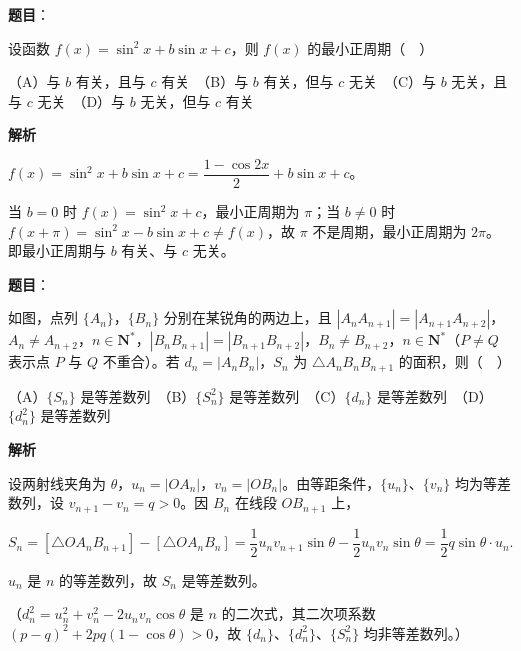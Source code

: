 \begin{answer}

\textbf{题目}：

设函数 \(f(x)=\sin^{2}x+b\sin x+c\)，则 \(f(x)\) 的最小正周期（　）

（A）与 \(b\) 有关，且与 \(c\) 有关　（B）与 \(b\) 有关，但与 \(c\) 无关　（C）与 \(b\) 无关，且与 \(c\) 无关　（D）与 \(b\) 无关，但与 \(c\) 有关

\textbf{解析}

\(f(x)=\sin^{2}x+b\sin x+c=\dfrac{1-\cos 2x}{2}+b\sin x+c\)。

当 \(b=0\) 时 \(f(x)=\sin^{2}x+c\)，最小正周期为 \(\pi\)；当 \(b\neq 0\) 时 \(f(x+\pi)=\sin^{2}x-b\sin x+c\neq f(x)\)，故 \(\pi\) 不是周期，最小正周期为 \(2\pi\)。即最小正周期与 \(b\) 有关、与 \(c\) 无关。


\end{answer}
\begin{answer}

\textbf{题目}：

如图，点列 \(\{A_{n}\}\)，\(\{B_{n}\}\) 分别在某锐角的两边上，且 \(|A_{n}A_{n+1}|=|A_{n+1}A_{n+2}|\)，\(A_{n}\neq A_{n+2}\)，\(n\in\mathbf{N}^{*}\)，\(|B_{n}B_{n+1}|=|B_{n+1}B_{n+2}|\)，\(B_{n}\neq B_{n+2}\)，\(n\in\mathbf{N}^{*}\)（\(P\neq Q\) 表示点 \(P\) 与 \(Q\) 不重合）。若 \(d_{n}=|A_{n}B_{n}|\)，\(S_{n}\) 为 \(\triangle A_{n}B_{n}B_{n+1}\) 的面积，则（　）
\nopagebreak[4]
\begin{center}\end{center}
\nopagebreak[4]
（A）\(\{S_{n}\}\) 是等差数列　（B）\(\{S_{n}^{2}\}\) 是等差数列　（C）\(\{d_{n}\}\) 是等差数列　（D）\(\{d_{n}^{2}\}\) 是等差数列

\textbf{解析}

设两射线夹角为 \(\theta\)，\(u_{n}=|OA_{n}|\)，\(v_{n}=|OB_{n}|\)。由等距条件，\(\{u_{n}\}\)、\(\{v_{n}\}\) 均为等差数列，设 \(v_{n+1}-v_{n}=q>0\)。因 \(B_{n}\) 在线段 \(OB_{n+1}\) 上，

\nopagebreak[4]
\[
S_{n}=[\triangle OA_{n}B_{n+1}]-[\triangle OA_{n}B_{n}]=\dfrac{1}{2}u_{n}v_{n+1}\sin\theta-\dfrac{1}{2}u_{n}v_{n}\sin\theta=\dfrac{1}{2}q\sin\theta\cdot u_{n}.
\]

\(u_{n}\) 是 \(n\) 的等差数列，故 \(S_{n}\) 是等差数列。

（\(d_{n}^{2}=u_{n}^{2}+v_{n}^{2}-2u_{n}v_{n}\cos\theta\) 是 \(n\) 的二次式，其二次项系数 \((p-q)^{2}+2pq(1-\cos\theta)>0\)，故 \(\{d_{n}\}\)、\(\{d_{n}^{2}\}\)、\(\{S_{n}^{2}\}\) 均非等差数列。）


\end{answer}

